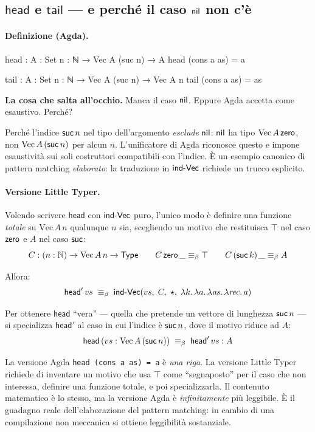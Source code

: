 \subsection*{$\mathsf{head}$ e $\mathsf{tail}$ --- e perch\'e il caso $\mathsf{nil}$ non c'\`e}

\paragraph{Definizione (Agda).}
\begin{agda}
head : {A : Set} {n : ℕ} → Vec A (suc n) → A
head (cons a as) = a

tail : {A : Set} {n : ℕ} → Vec A (suc n) → Vec A n
tail (cons a as) = as
\end{agda}

\noindent\textbf{La cosa che salta all'occhio.} Manca il caso $\mathsf{nil}$. Eppure Agda accetta come esaustivo. Perch\'e?

Perch\'e l'indice $\mathsf{suc}\,n$ nel tipo dell'argomento \emph{esclude} $\mathsf{nil}$: $\mathsf{nil}$ ha tipo $\mathrm{Vec}\,A\,\mathsf{zero}$, non $\mathrm{Vec}\,A\,(\mathsf{suc}\,n)$ per alcun $n$. L'unificatore di Agda riconosce questo e impone esaustivit\`a sui soli costruttori compatibili con l'indice. \`E un esempio canonico di pattern matching \emph{elaborato}: la traduzione in $\mathsf{ind\text{-}Vec}$ richiede un trucco esplicito.

\paragraph{Versione Little Typer.} Volendo scrivere $\mathsf{head}$ con $\mathsf{ind\text{-}Vec}$ puro, l'unico modo \`e definire una funzione \emph{totale} su $\mathrm{Vec}\,A\,n$ qualunque $n$ sia, scegliendo un motivo che restituisca $\top$ nel caso $\mathsf{zero}$ e $A$ nel caso $\mathsf{suc}$:
\[
C : (n : \mathbb{N}) \to \mathrm{Vec}\,A\,n \to \mathsf{Type}
\qquad
C\,\mathsf{zero}\,\_ \equiv_{\beta} \top
\qquad
C\,(\mathsf{suc}\,k)\,\_ \equiv_{\beta} A
\]

Allora:
\[
\mathsf{head}'\,vs \;\equiv_{\beta}\; \mathsf{ind\text{-}Vec}(vs,\;C,\;\star,\;\lambda k.\,\lambda a.\,\lambda \mathit{as}.\,\lambda\mathit{rec}.\,a)
\]

Per ottenere $\mathsf{head}$ ``vera'' --- quella che pretende un vettore di lunghezza $\mathsf{suc}\,n$ --- si specializza $\mathsf{head}'$ al caso in cui l'indice \`e $\mathsf{suc}\,n$, dove il motivo riduce ad $A$:
\[
\mathsf{head}\,(vs : \mathrm{Vec}\,A\,(\mathsf{suc}\,n)) \;\equiv_{\beta}\; \mathsf{head}'\,vs : A
\]

\begin{oss}
La versione Agda \texttt{head (cons a as) = a} \`e \emph{una riga}. La versione Little Typer richiede di inventare un motivo che usa $\top$ come ``segnaposto'' per il caso che non interessa, definire una funzione totale, e poi specializzarla. Il contenuto matematico \`e lo stesso, ma la versione Agda \`e \emph{infinitamente} pi\`u leggibile. \`E il guadagno reale dell'elaborazione del pattern matching: in cambio di una compilazione non meccanica si ottiene leggibilit\`a sostanziale.
\end{oss}

